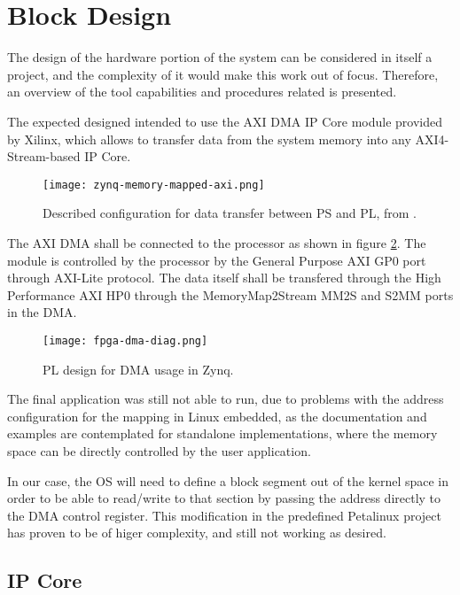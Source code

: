 \section{Block Design}

The design of the hardware portion of the system can be considered in itself a project, and the
complexity of it would make this work out of focus. Therefore, an overview of the tool capabilities
and procedures related is presented.

The expected designed intended to use the AXI DMA IP Core module provided by Xilinx, which allows to
transfer data from the system memory into any AXI4-Stream-based IP Core.

\begin{figure}[htp]
	\centering
	\texttt{[image: zynq-memory-mapped-axi.png]}
	\caption{Described configuration for data transfer between PS and PL, from \cite{UG1046}.}
	\label{fig:zynq-memory-mapped-axi}
\end{figure}

The AXI DMA shall be connected to the processor as shown in figure \ref{fig:fpga-dma-diag}. The
module is controlled by the processor by the General Purpose AXI GP0 port through AXI-Lite protocol.
The data itself shall be transfered through the High Performance AXI HP0 through the
MemoryMap2Stream MM2S and S2MM ports in the DMA.

\begin{figure}[htp]
	\centering
	\texttt{[image: fpga-dma-diag.png]}
	\caption{PL design for DMA usage in Zynq.}
	\label{fig:fpga-dma-diag}
\end{figure}

The final application was still not able to run, due to problems with the address configuration for
the mapping in Linux embedded, as the documentation and examples are contemplated for standalone
implementations, where the memory space can be directly controlled by the user application.

In our case, the OS will need to define a block segment out of the kernel space in order to be able
to read/write to that section by passing the address directly to the DMA control register. This
modification in the predefined Petalinux project has proven to be of higer complexity, and still not
working as desired.


\subsection{IP Core}


